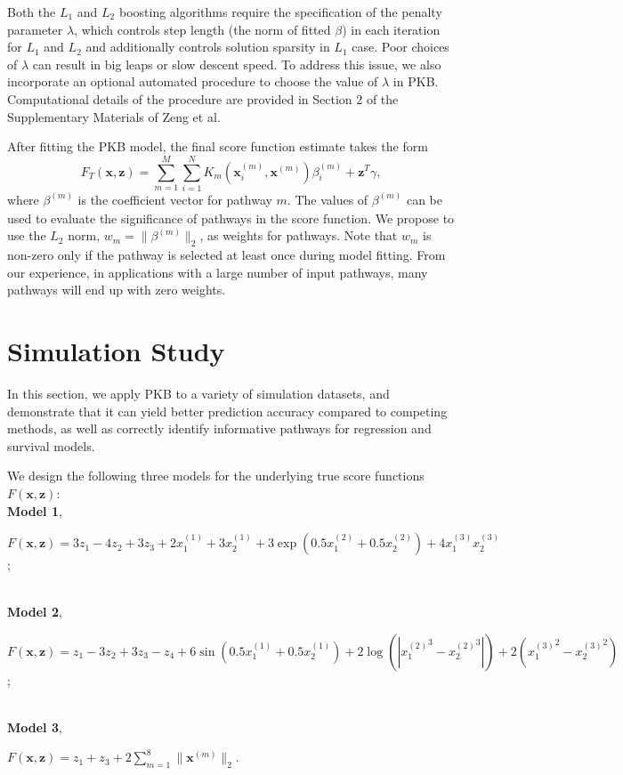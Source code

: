 \documentclass[a4paper,12pt]{article}
\newcommand{\bd}[1]{\mathbf{#1}}
\newcommand{\pathexpr}[3]{{#1}_{#2}^{(#3)}}
\begin{document}
Both the $L_1$ and $L_2$ boosting algorithms require the specification of the penalty parameter $\lambda$, which controls step length (the norm of fitted $\beta$) in each iteration for $L_1$ and $L_2$ and additionally controls solution sparsity in $L_1$ case. Poor choices of $\lambda$ can result in big leaps or slow descent speed. To address this issue, we also incorporate an optional automated procedure to choose the value of $\lambda$ in PKB. Computational details of the procedure are provided in Section 2 of the Supplementary Materials of Zeng et al.\cite{zeng2019pathway}

After fitting the PKB model, the final score function estimate takes the form
$$F_T(\bd{x}, \bd{z}) = \sum_{m=1}^M \sum_{i=1}^N K_m(\pathexpr{\bd{x}}{i}{m},\pathexpr{\bd{x}}{}{m})\pathexpr{\beta}{i}{m} + \bd{z}^T \gamma,$$
where $\pathexpr{\beta}{}{m}$ is the coefficient vector for pathway $m$. The values of $\pathexpr{\beta}{}{m}$ can be used to evaluate the significance of pathways in the score function. We propose to use the $L_2$ norm, $w_m = \|\beta^{(m)}\|_2$, as weights for pathways. Note that $w_m$ is non-zero only if the pathway is selected at least once during model fitting. From our experience, in applications with a large number of input pathways, many pathways will end up with zero weights.

\section{Simulation Study}\label{simu}
In this section, we apply PKB to a variety of simulation datasets, and demonstrate that it can yield better prediction accuracy compared to competing methods, as well as correctly identify informative pathways for regression and survival models. 

We design the following three models for the underlying true score functions $F(\bd{x},\bd{z})$: 
	 \\\textbf{Model 1},
	\\\centerline{$F(\bd{x},\bd{z}) = 3z_1 - 4z_2 + 3z_3 + 2\pathexpr{x}{1}{1}+3\pathexpr{x}{2}{1}+ 
	3\exp(0.5\pathexpr{x}{1}{2} + 0.5\pathexpr{x}{2}{2}) + 4\pathexpr{x}{1}{3}\pathexpr{x}{2}{3}$; }
	\\\textbf{Model 2},
	\\\centerline{$F(\bd{x},\bd{z}) = z_1 - 3z_2 + 3z_3 - z_4 + 6\sin(0.5\pathexpr{x}{1}{1} + 0.5\pathexpr{x}{2}{1}) + 2\log(|{\pathexpr{x}{1}{2}}^3 - {\pathexpr{x}{2}{2}}^3|) + 2({\pathexpr{x}{1}{3}}^2-{\pathexpr{x}{2}{3}}^2)$; }
	\\\textbf{Model 3},
	\\\centerline{$F(\bd{x},\bd{z}) = z_1 + z_3 + 2\sum_{m=1}^{8} \|\pathexpr{\bd{x}}{}{m}\|_2.$}
\end{document}
